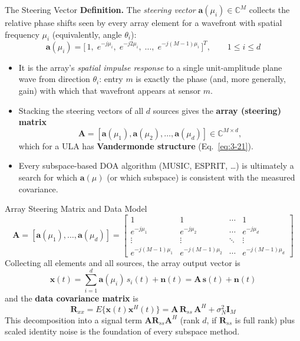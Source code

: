 \documentclass[10pt,aspectratio=169]{beamer}
\newcommand{\bx}{\bm{x}}
\newcommand{\bs}{\bm{s}}
\newcommand{\bn}{\bm{n}}
\newcommand{\bA}{\bm{A}}
\newcommand{\ba}{\bm{a}}
\newcommand{\bR}{\bm{R}}
\newcommand{\bI}{\bm{I}}
\begin{document}
\begin{frame}{The Steering Vector}
\textbf{Definition.} The \emph{steering vector} $\ba(\mu_i)\in\mathbb{C}^M$ collects the relative phase shifts seen by every array element for a wavefront with spatial frequency $\mu_i$ (equivalently, angle $\theta_i$):
\begin{equation}
	\ba(\mu_i) = \big[\,1,\; e^{-j\mu_i},\; e^{-j2\mu_i},\; \dots,\; e^{-j(M-1)\mu_i}\,\big]^T, \qquad 1\le i \le d
	\label{eq:3-20}
\end{equation}
\begin{itemize}
	\item It is the array's \emph{spatial impulse response} to a single unit-amplitude plane wave from direction $\theta_i$: entry $m$ is exactly the phase (and, more generally, gain) with which that wavefront appears at sensor $m$.
	\item Stacking the steering vectors of all $d$ sources gives the \textbf{array (steering) matrix}
	\[
	\bA = [\ba(\mu_1), \ba(\mu_2), \dots, \ba(\mu_d)] \in \mathbb{C}^{M\times d},
	\]
	which for a ULA has \textbf{Vandermonde structure} (Eq.~\ref{eq:3-21}).
	\item Every subspace-based DOA algorithm (MUSIC, ESPRIT, \dots) is ultimately a search for which $\ba(\mu)$ (or which subspace) is consistent with the measured covariance.
\end{itemize}
\end{frame}

\begin{frame}{Array Steering Matrix and Data Model}
\begin{equation}
	\bA = [\ba(\mu_1),\dots,\ba(\mu_d)] =
	\begin{bmatrix}
		1 & 1 & \cdots & 1 \\
		e^{-j\mu_1} & e^{-j\mu_2} & \cdots & e^{-j\mu_d}\\
		\vdots & \vdots & \ddots & \vdots \\
		e^{-j(M-1)\mu_1} & e^{-j(M-1)\mu_2} & \cdots & e^{-j(M-1)\mu_d}
	\end{bmatrix}
	\label{eq:3-21}
\end{equation}
Collecting all elements and all sources, the array output vector is
\begin{equation}
	\bx(t) = \sum_{i=1}^d \ba(\mu_i)\, s_i(t) + \bn(t) = \bA\, \bs(t) + \bn(t)
	\label{eq:3-9}
\end{equation}
and the \textbf{data covariance matrix} is
\begin{equation}
	\bR_{xx} = E\{\bx(t)\bx^H(t)\} = \bA\,\bR_{ss}\,\bA^H + \sigma_N^2 \bI_M
	\label{eq:4-1}
\end{equation}
This decomposition into a signal term $\bA\bR_{ss}\bA^H$ (rank $d$, if $\bR_{ss}$ is full rank) plus scaled identity noise is the foundation of every subspace method.
\end{frame}
\end{document}
